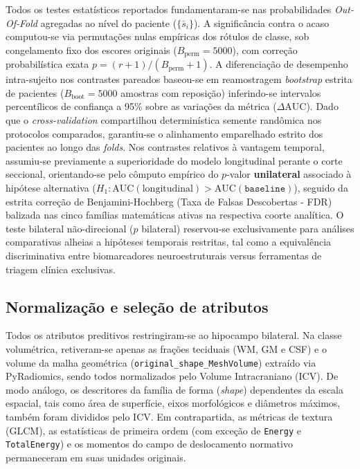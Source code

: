 \documentclass[review]{elsarticle}
\newcommand{\code}[1]{\texttt{#1}}
\begin{document}
	Todos os testes estatísticos reportados fundamentaram-se nas probabilidades \emph{Out-Of-Fold} agregadas ao nível do paciente ($\{\bar{s}_i\}$). 
	A significância contra o acaso computou-se via permutações nulas empíricas dos rótulos de classe, sob congelamento fixo dos escores originais ($B_{\mathrm{perm}}=5000$), com correção probabilística exata $p=(r+1)/(B_{\mathrm{perm}}+1)$. 
	A diferenciação de desempenho intra-sujeito nos contrastes pareados baseou-se em reamostragem \emph{bootstrap} estrita de pacientes ($B_{\mathrm{boot}}=5000$ amostras com reposição) inferindo-se intervalos percentílicos de confiança a 95\% sobre as variações da métrica ($\Delta\mathrm{AUC}$).
	Dado que o \emph{cross-validation} compartilhou determinística semente randômica nos protocolos comparados, garantiu-se o alinhamento emparelhado estrito dos pacientes ao longo das \emph{folds}. Nos contrastes relativos à vantagem temporal, assumiu-se previamente a superioridade do modelo longitudinal perante o corte seccional, orientando-se pelo cômputo empírico do $p$-valor \textbf{unilateral} associado à hipótese alternativa ($H_1\!: \mathrm{AUC}(\mathrm{longitudinal}) > \mathrm{AUC}(\code{baseline})$), seguido da estrita correção de Benjamini-Hochberg (Taxa de Falsas Descobertas - FDR) balizada nas cinco famílias matemáticas ativas na respectiva coorte analítica. O teste bilateral não-direcional ($p$ bilateral) reservou-se exclusivamente para análises comparativas alheias a hipóteses temporais restritas, tal como a equivalência discriminativa entre biomarcadores neuroestruturais versus ferramentas de triagem clínica exclusivas.
	
	\subsection{Normalização e seleção de atributos}\label{sec:feature-selection}
	
	Todos os atributos preditivos restringiram-se ao hipocampo bilateral. Na classe volumétrica, retiveram-se apenas as frações teciduais (WM, GM e CSF) e o volume da malha geométrica (\code{original\_shape\_MeshVolume}) extraído via PyRadiomics, sendo todos normalizados pelo Volume Intracraniano (ICV). De modo análogo, os descritores da família de forma (\emph{shape}) dependentes da escala espacial, tais como área de superfície, eixos morfológicos e diâmetros máximos, também foram divididos pelo ICV. Em contrapartida, as métricas de textura (GLCM), as estatísticas de primeira ordem (com exceção de \code{Energy} e \code{TotalEnergy}) e os momentos do campo de deslocamento normativo permaneceram em suas unidades originais.
	
\end{document}
